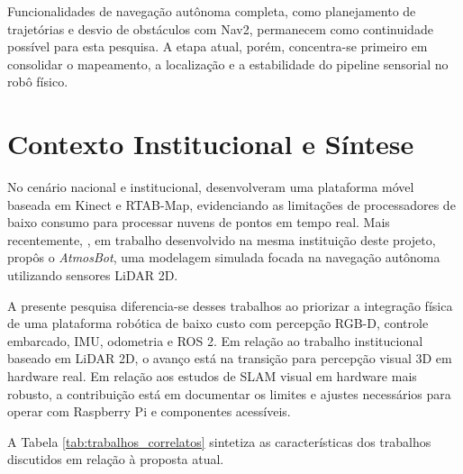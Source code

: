 Funcionalidades de navegação autônoma completa, como planejamento de trajetórias e desvio de obstáculos com Nav2, permanecem como continuidade possível para esta pesquisa. A etapa atual, porém, concentra-se primeiro em consolidar o mapeamento, a localização e a estabilidade do pipeline sensorial no robô físico.

\section{Contexto Institucional e Síntese}

No cenário nacional e institucional,  desenvolveram uma plataforma móvel baseada em Kinect e RTAB-Map, evidenciando as limitações de processadores de baixo consumo para processar nuvens de pontos em tempo real. Mais recentemente, , em trabalho desenvolvido na mesma instituição deste projeto, propôs o \textit{AtmosBot}, uma modelagem simulada focada na navegação autônoma utilizando sensores LiDAR 2D.

A presente pesquisa diferencia-se desses trabalhos ao priorizar a integração física de uma plataforma robótica de baixo custo com percepção RGB-D, controle embarcado, IMU, odometria e ROS 2. Em relação ao trabalho institucional baseado em LiDAR 2D, o avanço está na transição para percepção visual 3D em hardware real. Em relação aos estudos de SLAM visual em hardware mais robusto, a contribuição está em documentar os limites e ajustes necessários para operar com Raspberry Pi e componentes acessíveis.

A Tabela \ref{tab:trabalhos_correlatos} sintetiza as características dos trabalhos discutidos em relação à proposta atual.

